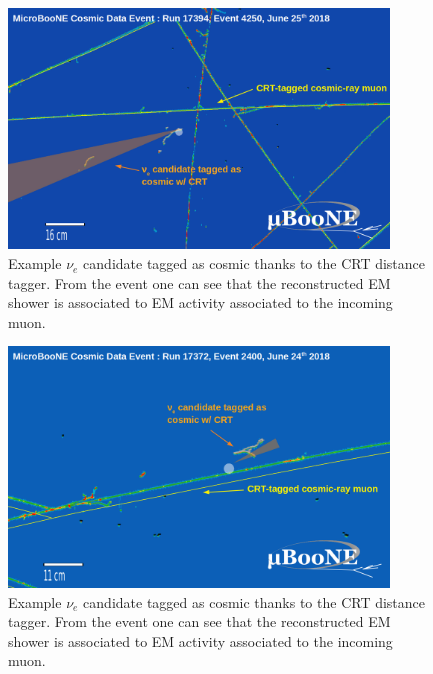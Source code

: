 \begin{figure}[h!]
\centering
\includegraphics[width=0.9\textwidth]{images/crttagger_02.png}
\caption{Example $\nu_e$ candidate tagged as cosmic thanks to the CRT distance tagger. From the event one can see that the reconstructed EM shower is associated to EM activity associated to the incoming muon.}
\label{fig:crtdist00}
\end{figure}

\begin{figure}[h!]
\centering
\includegraphics[width=0.9\textwidth]{images/crttagger_03.png}
\caption{Example $\nu_e$ candidate tagged as cosmic thanks to the CRT distance tagger. From the event one can see that the reconstructed EM shower is associated to EM activity associated to the incoming muon.}
\label{fig:crtdist00}
\end{figure}
